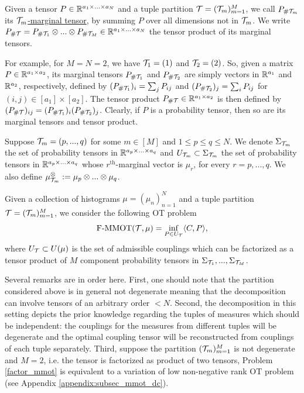 \begin{definition}
  Given a tensor $P \in \mathbb R^{a_1 \times ... \times a_N}$ and a tuple partition $\mathcal T = (\mathcal T_m)_{m=1}^M$,
  we call $P_{\# \mathcal T_m}$ its \underline{$\mathcal T_m$-marginal tensor}, by summing $P$ over all dimensions not in $\mathcal T_m$.
  We write $P_{\# \mathcal T} = P_{\# \mathcal T_1} \otimes ... \otimes P_{\# \mathcal T_M} \in \mathbb R^{a_1 \times ... \times a_N}$
  the tensor product of its marginal tensors.
\end{definition}
For example, for $M=N=2$, we have $\mathcal T_1 = (1)$ and $\mathcal T_2 = (2)$. So, given a matrix
$P \in \mathbb R^{a_1 \times a_2}$, its marginal tensors $P_{\# \mathcal T_1}$ and $P_{\# \mathcal T_2}$ are simply vectors in
$\mathbb R^{a_1}$ and $\mathbb R^{a_2}$, respectively, defined by $(P_{\# \mathcal T_1})_i = \sum_j P_{ij}$ and
$(P_{\# \mathcal T_2})_j = \sum_i P_{ij}$ for $(i,j) \in [a_1] \times [a_2]$. The tensor product
$P_{\# \mathcal T} \in \mathbb R^{a_1 \times a_2}$ is then defined by
$(P_{\#\mathcal T})_{ij} = (P_{\# \mathcal T_1})_i (P_{\# \mathcal T_2})_j$.
Clearly, if $P$ is a probability tensor, then so are its marginal tensors and tensor product.

Suppose $\mathcal T_m = (p,...,q)$ for some $m \in [M]$ and $1 \leq p \leq q \leq N$. We denote
$\Sigma_{\mathcal T_m}$ the set of probability tensors in $\mathbb R^{a_p \times ... \times a_q}$ and
$U_{\mathcal T_m} \subset \Sigma_{\mathcal T_m}$ the set
of probability tensors in $\mathbb R^{a_p \times ... \times a_q}$ whose
$r^{\text{th}}$-marginal vector is $\mu_r$, for every $r = p,...,q$.
We also define $\mu^{\otimes}_{\mathcal T_m} := \mu_p \otimes ... \otimes \mu_q$.

\begin{definition}
  Given a collection of histograms $\mu = (\mu_n)_{n=1}^N$ and a tuple partition $\mathcal T = (\mathcal T_m)_{m=1}^M$,
  we consider the following OT problem
  \begin{equation} \label{factor_mmot}
    \text{F-MMOT}( \mathcal T, \mu) = \inf_{P \in U_{\mathcal T}} \langle C, P \rangle,
  \end{equation}
  where $U_{\mathcal T} \subset U(\mu)$ is the set of admissible couplings which can be factorized as a tensor product of $M$
  component probability tensors in $\Sigma_{\mathcal T_1}, ..., \Sigma_{\mathcal T_M}$.
\end{definition}
Several remarks are in order here. First, one should note that the partition considered above is in general not degenerate meaning
that the decomposition can involve tensors of an arbitrary order $<N$. Second, the decomposition in this setting depicts the prior
knowledge regarding the tuples of measures which should be independent: the couplings for the measures from different tuples will
be degenerate and the optimal coupling tensor will be reconstructed from couplings of each tuple separately.
Third, suppose the partition $(\mathcal T_m)_{m=1}^M$ is not degenerate and $M=2$, i.e. the tensor is factorized as product of
two tensors, Problem \eqref{factor_mmot} is equivalent to a variation of low non-negative rank OT problem
(see Appendix \ref{appendix:subsec_mmot_dc}).

